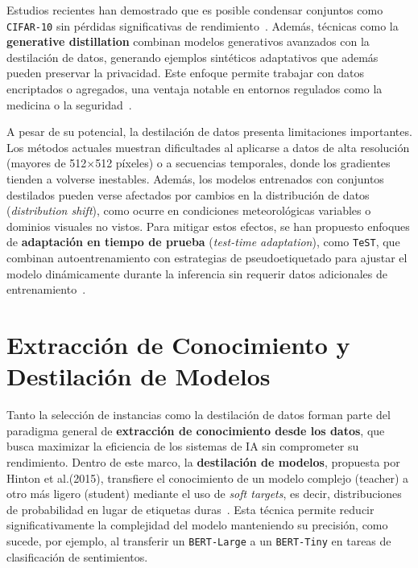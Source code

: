 Estudios recientes han demostrado que es posible condensar conjuntos como \texttt{CIFAR-10} sin pérdidas significativas de rendimiento~\cite{leiComprehensiveSurveyDataset2024}.
Además, técnicas como la \textbf{generative distillation} combinan modelos generativos avanzados con la destilación de datos,
generando ejemplos sintéticos adaptativos que además pueden preservar la privacidad.
Este enfoque permite trabajar con datos encriptados o agregados, una ventaja notable en entornos regulados como la medicina o la seguridad~\cite{liGenerativeDatasetDistillation2024}.

A pesar de su potencial, la destilación de datos presenta limitaciones importantes.
Los métodos actuales muestran dificultades al aplicarse a datos de alta resolución (mayores de 512$\times$512 píxeles) o a secuencias temporales,
donde los gradientes tienden a volverse inestables.
Además, los modelos entrenados con conjuntos destilados pueden verse afectados por cambios en la distribución de datos (\textit{distribution shift}),
como ocurre en condiciones meteorológicas variables o dominios visuales no vistos.
Para mitigar estos efectos, se han propuesto enfoques de \textbf{adaptación en tiempo de prueba} (\textit{test-time adaptation}),
como \texttt{TeST}, que combinan autoentrenamiento con estrategias de pseudoetiquetado para ajustar el modelo dinámicamente
durante la inferencia sin requerir datos adicionales de entrenamiento~\cite{sinhaTeSTTesttimeSelfTraining2022}.


\section{Extracción de Conocimiento y Destilación de Modelos}
Tanto la selección de instancias como la destilación de datos forman parte del paradigma general de \textbf{extracción de conocimiento desde los datos},
que busca maximizar la eficiencia de los sistemas de IA sin comprometer su rendimiento.
Dentro de este marco, la \textbf{destilación de modelos}, propuesta por Hinton et al.(2015),
transfiere el conocimiento de un modelo complejo (teacher) a otro más ligero (student) mediante el uso de \textit{soft targets},
es decir, distribuciones de probabilidad en lugar de etiquetas duras~\cite{hintonDistillingKnowledgeNeural2015}.
Esta técnica permite reducir significativamente la complejidad del modelo manteniendo su precisión, como sucede, por ejemplo,
al transferir un \texttt{BERT-Large} a un \texttt{BERT-Tiny} en tareas de clasificación de sentimientos.

